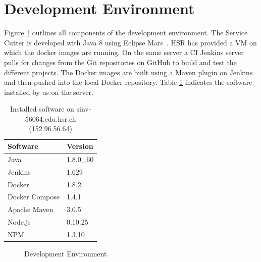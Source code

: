 \section{Development Environment}

Figure \ref{fig:devenvironment} outlines all components of the development environment. The Service Cutter is developed with Java 8 using Eclipse Mars~\cite{eclipsemars}. \gls{HSR} has provided a \gls{VM} on which the \gls{docker} images are running. On the same server a \gls{CI} Jenkins server pulls for changes from the Git repositories on GitHub to build and test the different projects. The Docker images are built using a Maven plugin on Jenkins and then pushed into the local Docker repository. Table \ref{tab:vm} indicates the software installed by us on the server.


\begin{table}[H]
\begin{center}
\begin{tabular}
{|p{100pt} p{80pt}|}
\hline \textbf{Software} & \textbf{Version} \\ 
\hline Java & 1.8.0\_60 \\ 
\hline Jenkins & 1.629 \\ 
\hline Docker & 1.8.2 \\ 
\hline Docker Compose & 1.4.1 \\
\hline Apache Maven & 3.0.5 \\
\hline Node.js & 0.10.25 \\
\hline NPM & 1.3.10 \\
\hline 
\end{tabular} 
\caption{Installed software on sinv-56064.edu.hsr.ch (152.96.56.64)}
\label{tab:vm}
\end{center}
\end{table}

\begin{figure}[H]
	\caption{Development Environment}
	\label{fig:devenvironment}
\end{figure}
